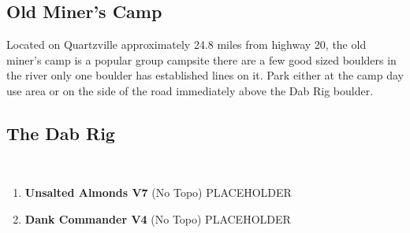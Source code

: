 \begin{multicols*}{2}
		\section{Old Miner's Camp}\label{sa:Old Miner's Camp}
	Located on Quartzville approximately 24.8 miles from highway 20, the old miner's camp is a popular group campsite there are a few good sized boulders in the river only one boulder has established lines on it. Park either at the camp day use area or on the side of the road immediately above the Dab Rig boulder.
			\subsection*{The Dab Rig}\label{bf:The Dab Rig}
			\
			
				\begin{enumerate}[]
					\setcounter{enumi}{0}
					\item\label{rt:Unsalted Almonds} \colorbox{Goldenrod!50}{\textbf{Unsalted Almonds V7  } }
						\newline (No Topo) 
					\newline PLACEHOLDER\
					\setcounter{enumi}{1}
					\item\label{rt:Dank Commander} \colorbox{RoyalBlue!20}{\textbf{Dank Commander V4  } }
						\newline (No Topo) 
					\newline PLACEHOLDER\
				\end{enumerate}
\end{multicols*}
\clearpage